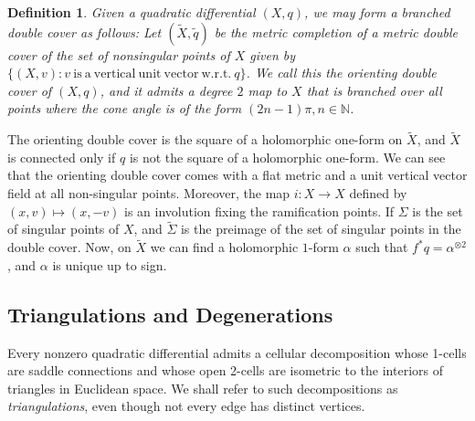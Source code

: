 \documentclass[12pt]{article}
\newtheorem{definition}[theorem]{Definition}
\newcommand{\nn}{\mathbb{N}}
\begin{document}
\begin{definition}Given a quadratic differential $(X,q)$, we may form a branched double cover as follows: Let $(\tilde{X},\tilde{q})$ be the metric completion of a metric double cover of the set of nonsingular points of $X$ given by $\{(X,v): v \mathrm{~is~a~vertical~unit~vector~w.r.t.~}q\}$. We call this the \emph{orienting double cover} of $(X,q)$, and it admits a degree $2$ map to $X$ that is branched over all points where the cone angle is of the form $(2n-1)\pi, n \in \nn$.\end{definition}

\noindent The orienting double cover is the square of a holomorphic one-form on $\tilde{X}$, and $\tilde{X}$ is connected only if $q$ is not the square of a holomorphic one-form. We can see that the orienting double cover comes with a flat metric and a unit vertical vector field at all non-singular points. Moreover, the map $i:X \to X$ defined by $(x,v) \mapsto (x,-v)$ is an involution fixing the ramification points. If $\Sigma$ is the set of singular points of $X$, and $\tilde{\Sigma}$ is the preimage of the set of singular points in the double cover. Now, on $\tilde{X}$ we can find a holomorphic $1$-form $\alpha$ such that $f^*{q} = \alpha^{\otimes 2}$, and $\alpha$ is unique up to sign.

\subsection{Triangulations and Degenerations}

\noindent Every nonzero quadratic differential admits a cellular decomposition whose 1-cells are saddle connections and whose open 2-cells are isometric to the interiors of triangles in Euclidean space. We shall refer to such decompositions as \emph{triangulations}, even though not every edge has distinct vertices.\\
\end{document}
